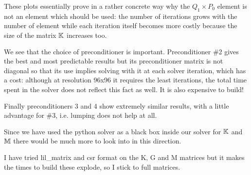 \newpage

These plots essentially prove in a rather concrete way why the $Q_1\times P_0$ element 
is not an element which should be used: the number of iterations grows with the 
number of element while each iteration itself becomes more costly because the size of the 
matrix ${\mathbb{K}}$ increases too.

We see that the choice of preconditioner is important. Preconditioner \#2 gives the best 
and most predictable results but its preconditioner matrix is not diagonal so that 
its use implies solving with it at each solver iteration, which has a cost: although at 
resolution 96x96 it requires the least iterations, the total time spent in the solver does
not reflect this fact as well. It is also expensive to build! 

Finally preconditioners 3 and 4 show extremely similar results, with a little 
advantage for \#3, i.e. lumping does not help at all.

Since we have used the python solver as a black box inside our solver for ${\mathbb{K}}$ and ${{\mathbb{M}}}$
there would be much more to look into in this direction.

\begin{remark}
I have tried lil\_matrix and csr format on the K, G and M matrices 
but it makes the times to build these explode, so I stick to full matrices. 
\end{remark}




